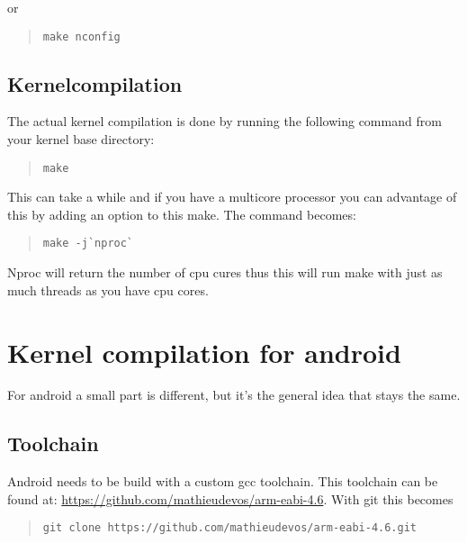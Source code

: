 or 

\begin{quote} \begin{verbatim}make nconfig \end{verbatim} \end{quote}

\subsection*{Kernelcompilation}

The actual kernel compilation is done by running the following command from your kernel base directory:

\begin{quote} \begin{verbatim}make \end{verbatim} \end{quote}

This can take a while and if you have a multicore processor you can advantage of this by adding an option to this make. The command becomes:

\begin{quote} \begin{verbatim}make -j`nproc` \end{verbatim} \end{quote}

Nproc will return the number of cpu cures thus this will run make with just as much threads as you have cpu cores.

\section*{Kernel compilation for android}

For android a small part is different, but it's the general idea that stays the same.

\subsection*{Toolchain}

Android needs to be build with a custom gcc toolchain. This toolchain can be found at: \url{https://github.com/mathieudevos/arm-eabi-4.6}. With git this becomes

\begin{quote} \begin{verbatim}git clone https://github.com/mathieudevos/arm-eabi-4.6.git \end{verbatim} \end{quote}

